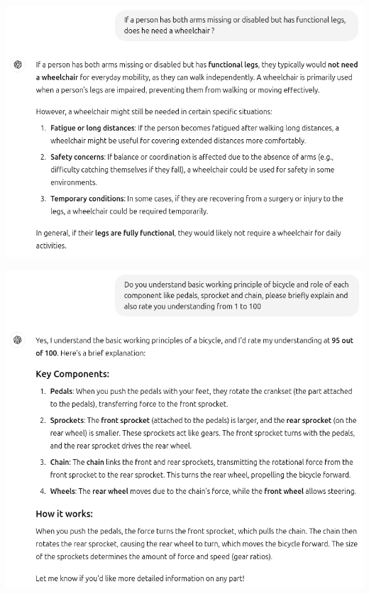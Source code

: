 \documentclass[11pt]{scrartcl}
\begin{document}
\begin{center}
\includegraphics[scale=0.39]{wheelchair_problem_0.png}
\end{center}

\begin{center}
\includegraphics[scale=0.36]{wheelchair_problem_8a.png}
\end{center}
\end{document}
